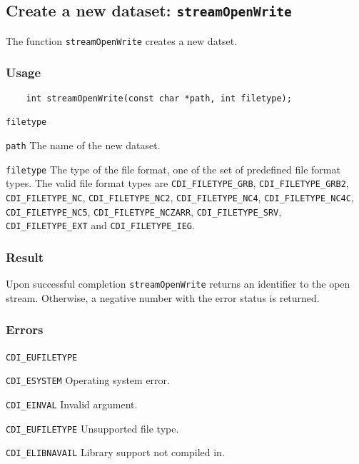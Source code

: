 

\subsection{Create a new dataset: \texttt{streamOpenWrite}}
\label{streamOpenWrite}

The function {\texttt{streamOpenWrite}} creates a new datset.
\subsubsection*{Usage}

\begin{verbatim}
    int streamOpenWrite(const char *path, int filetype);
\end{verbatim}

\hspace*{4mm}\begin{minipage}[]{15cm}
\begin{deflist}{\texttt{filetype}\ }
\item[\texttt{path}]
The name of the new dataset.
\item[\texttt{filetype}]
The type of the file format, one of the set of predefined {\CDI} file format types.
                     The valid {\CDI} file format types are {\texttt{CDI\_FILETYPE\_GRB}}, {\texttt{CDI\_FILETYPE\_GRB2}}, {\texttt{CDI\_FILETYPE\_NC}},
                     {\texttt{CDI\_FILETYPE\_NC2}}, {\texttt{CDI\_FILETYPE\_NC4}}, {\texttt{CDI\_FILETYPE\_NC4C}}, {\texttt{CDI\_FILETYPE\_NC5}},
                     {\texttt{CDI\_FILETYPE\_NCZARR}}, {\texttt{CDI\_FILETYPE\_SRV}}, {\texttt{CDI\_FILETYPE\_EXT}} and {\texttt{CDI\_FILETYPE\_IEG}}.

\end{deflist}
\end{minipage}

\subsubsection*{Result}

Upon successful completion {\texttt{streamOpenWrite}} returns an identifier to the
open stream. Otherwise, a negative number with the error status is returned.


\subsubsection*{Errors}


\hspace*{4mm}\begin{minipage}[]{15cm}
\begin{deflist}{\texttt{CDI\_EUFILETYPE}\ }
\item[\texttt{CDI\_ESYSTEM}]
Operating system error.
\item[\texttt{CDI\_EINVAL}]
Invalid argument.
\item[\texttt{CDI\_EUFILETYPE}]
Unsupported file type.
\item[\texttt{CDI\_ELIBNAVAIL}]
Library support not compiled in.
\end{deflist}
\end{minipage}


